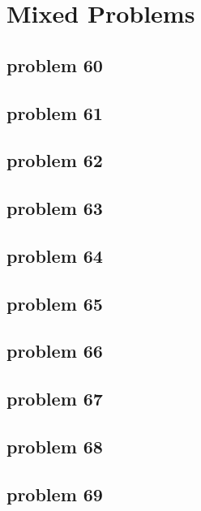 \section{Mixed Problems}

\subsection{problem 60}


\subsection{problem 61}


\subsection{problem 62}


\subsection{problem 63}


\subsection{problem 64}


\subsection{problem 65}


\subsection{problem 66}


\subsection{problem 67}


\subsection{problem 68}


\subsection{problem 69}

